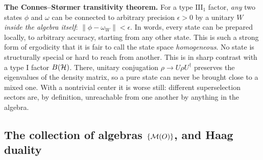 \textbf{The Connes--St\o rmer transitivity theorem.} For a type $\mathrm{III}_1$ factor, \emph{any} two states
$\phi$ and $\omega$ can be connected to arbitrary precision $\epsilon>0$ by a unitary $W$ \emph{inside the
algebra itself}: $\|\phi-\omega_W\|<\epsilon$. In words, every state can be prepared locally, to arbitrary
accuracy, starting from any other state. This is such a strong form of ergodicity that it is fair to call the
state space \emph{homogeneous}. No state is structurally special or hard to reach from another. This is in
sharp contrast with a type I factor $B(\mathcal{H})$. There, unitary conjugation $\rho\to U\rho U^\dagger$ preserves the
eigenvalues of the density matrix, so a pure state can never be brought close to a mixed one. With a
nontrivial center it is worse still: different superselection sectors are, by definition, unreachable from one
another by anything in the algebra.

\subsection*{The collection of algebras $\{\mathcal{M}(O)\}$, and Haag duality}

